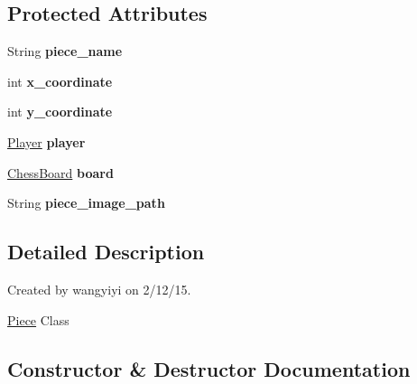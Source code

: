 \subsection*{Protected Attributes}
\begin{DoxyCompactItemize}
\item 
\hypertarget{classpiece_1_1_piece_a670862c335c65ea88dce5269c9ce9bfb}{}String {\bfseries piece\+\_\+name}\label{classpiece_1_1_piece_a670862c335c65ea88dce5269c9ce9bfb}

\item 
\hypertarget{classpiece_1_1_piece_aedff76d42dc52074d88776c447d75aac}{}int {\bfseries x\+\_\+coordinate}\label{classpiece_1_1_piece_aedff76d42dc52074d88776c447d75aac}

\item 
\hypertarget{classpiece_1_1_piece_a5eb75915739d2aac27293242b4b062c3}{}int {\bfseries y\+\_\+coordinate}\label{classpiece_1_1_piece_a5eb75915739d2aac27293242b4b062c3}

\item 
\hypertarget{classpiece_1_1_piece_a7aef88c8a61c1cd4a469aa15393ae1c2}{}\hyperlink{enumchessboard_1_1_player}{Player} {\bfseries player}\label{classpiece_1_1_piece_a7aef88c8a61c1cd4a469aa15393ae1c2}

\item 
\hypertarget{classpiece_1_1_piece_a89bee87e940fc2718964d92e842517d7}{}\hyperlink{classchessboard_1_1_chess_board}{Chess\+Board} {\bfseries board}\label{classpiece_1_1_piece_a89bee87e940fc2718964d92e842517d7}

\item 
\hypertarget{classpiece_1_1_piece_af66e4d5f1b6324a93d43f7778be2da36}{}String {\bfseries piece\+\_\+image\+\_\+path}\label{classpiece_1_1_piece_af66e4d5f1b6324a93d43f7778be2da36}

\end{DoxyCompactItemize}


\subsection{Detailed Description}
Created by wangyiyi on 2/12/15.

\hyperlink{classpiece_1_1_piece}{Piece} Class 

\subsection{Constructor \& Destructor Documentation}
\hypertarget{classpiece_1_1_piece_a2a951c56b9c86a93fab817ddb7da4413}{}
